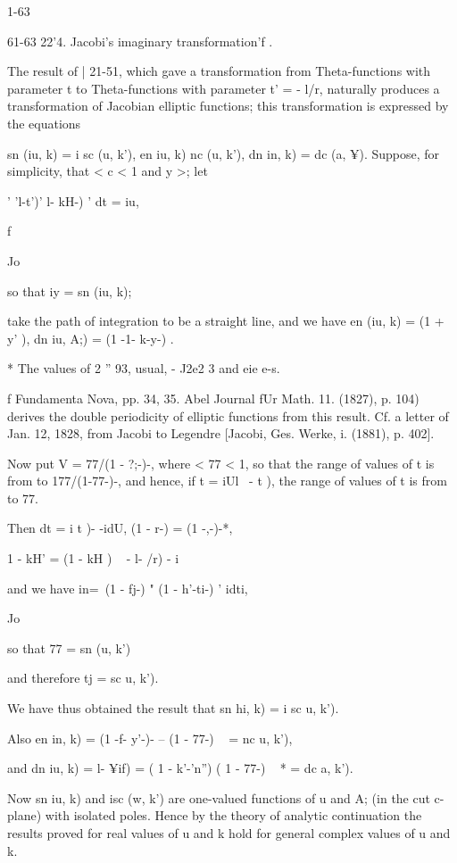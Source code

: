 1-63

61-63 22'4. Jacobi's imaginary transformation'f .

The result of | 21-51, which gave a transformation from
Theta-functions with parameter t to Theta-functions with parameter t'
= - l/r, naturally produces a transformation of Jacobian elliptic
functions; this transformation is expressed by the equations

sn (iu, k) = i sc (u, k'), en iu, k) nc (u, k'), dn in, k) = dc (a,
¥). Suppose, for simplicity, that < c < 1 and y >; let

' 'l-t')' l- kH-) ' dt = iu,

f

Jo

so that iy = sn (iu, k);

take the path of integration to be a straight line, and we have en
(iu, k) = (1 + y' ), dn iu, A;) = (1 -1- k-y-) .

* The values of 2 '' 93, usual, - J2e2 3 and eie e-s.

f Fundamenta Nova, pp. 34, 35. Abel Journal fUr Math. 11. (1827), p.
104) derives the double periodicity of elliptic functions from this
result. Cf. a letter of Jan. 12, 1828, from Jacobi to Legendre
[Jacobi, Ges. Werke, i. (1881), p. 402].

%
%

Now put V = 77/(1 - ?;-)-, where < 77 < 1, so that the range of values
of t is from to 177/(1-77-)-, and hence, if t = iUl \ - t ), the
range of values of t is from to 77.

Then dt = i t )- -idU, (1 - r-) = (1 -,-)-*,

1 - kH' = (1 - kH ) ~ - l- /r) - i

and we have in=\ (1 - fj-) " (1 - h'-ti-) ' idti,

Jo

so that 77 = sn (u, k')

and therefore tj = sc u, k').

We have thus obtained the result that sn hi, k) = i sc u, k').

Also en in, k) = (1 -f- y'-)- -- (1 - 77-) ~ = nc u, k'),

and dn iu, k) = l- ¥if) = ( 1 - k'-'n'') ( 1 - 77-) ~ * = dc a, k').

Now sn iu, k) and isc (w, k') are one-valued functions of u and A; (in
the cut c-plane) with isolated poles. Hence by the theory of analytic
continuation the results proved for real values of u and k hold for
general complex values of u and k.

